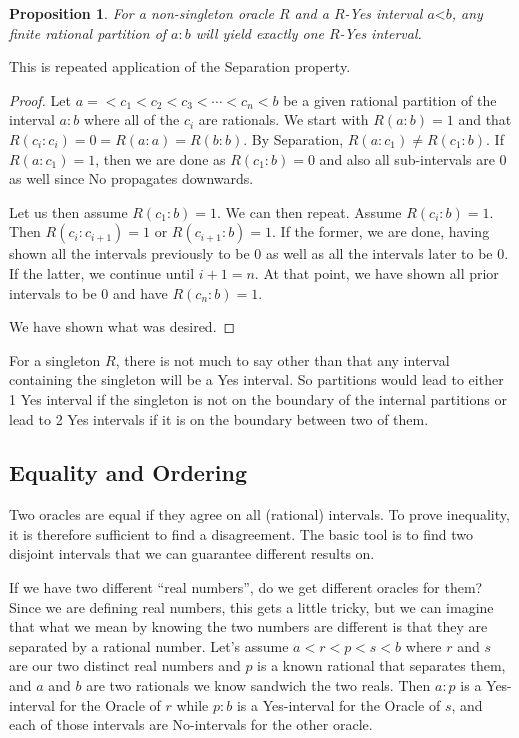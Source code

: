 \documentclass[12pt]{article}
\newtheorem{proposition}{Proposition}
\theoremstyle{remark}
\newcommand{\lt}{\mathord{<}}
\begin{document}
\begin{proposition}\label{pr:multi}
For a non-singleton oracle $R$ and a $R$-Yes interval $a\lt b$, any finite rational partition of $a:b$ will yield exactly one $R$-Yes interval. 
\end{proposition}

This is repeated application of the Separation property. 

\begin{proof}
Let $a= < c_1 < c_2 < c_3 < \cdots < c_n < b$ be a given rational partition of the interval $a:b$ where all of the $c_i$ are rationals. We start with $R(a:b) = 1$ and that $R(c_i:c_i) = 0 = R(a:a) = R(b:b)$. By Separation, $R(a:c_1) \neq R(c_1:b)$. If $R(a:c_1)=1$, then we are done as $R(c_1:b)=0$ and also all sub-intervals are 0 as well since No propagates downwards. 

Let us then assume $R(c_1:b)=1$. We can then repeat. Assume $R(c_i:b)=1$. Then $R(c_i:c_{i+1})=1$ or $R(c_{i+1}:b)=1$. If the former, we are done, having shown all the intervals previously to be 0 as well as all the intervals later to be 0.  If the latter, we continue until $i+1 = n$. At that point, we have shown all prior intervals to be 0 and have $R(c_n:b) = 1$. 

We have shown what was desired. 
\end{proof}

For a singleton $R$, there is not much to say other than that any interval containing the singleton will be a Yes interval. So partitions would lead to either 1 Yes interval if the singleton is not on the boundary of the internal partitions or lead to 2 Yes intervals if it is on the boundary between two of them. 

\subsection{Equality and Ordering}

Two oracles are equal if they agree on all (rational) intervals. To prove inequality, it is therefore sufficient to find a disagreement. The basic tool is to find two disjoint intervals that we can guarantee different results on. 

If we have two different ``real numbers'', do we get different oracles for them? Since we are defining real numbers, this gets a little tricky, but we can imagine that what we mean by knowing the two numbers are different is that they are separated by a rational number. Let's assume $a < r < p < s < b$ where $r$ and $s$ are our two distinct real numbers and $p$ is a known rational that separates them, and $a$ and $b$ are two rationals we know sandwich the two reals. Then $a:p$ is a Yes-interval for the Oracle of $r$ while $p:b$ is a Yes-interval for the Oracle of $s$, and each of those intervals are No-intervals for the other oracle. 
\end{document}
